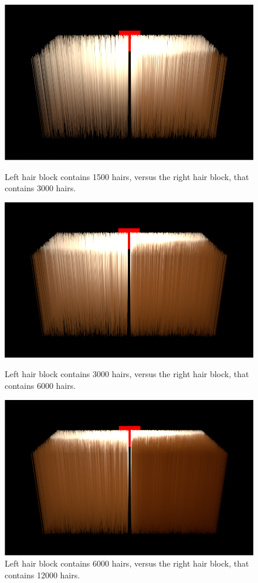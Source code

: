 \documentclass[11pt,a4paper]{report}
\begin{document}
\begin{figure}[h]
\begin{center}
\includegraphics[scale=0.35]{images/dualblock/dualblock_1500_3000_.png} 
\label{dualblock_results}
\caption{Left hair block contains 1500 hairs, versus the right hair block, that contains 3000 hairs.}

\includegraphics[scale=0.35]{images/dualblock/dualblock_3000_6000_.png}
\label{dualblock_results}
\caption{Left hair block contains 3000 hairs, versus the right hair block, that contains 6000 hairs.}

\includegraphics[scale=0.35]{images/dualblock/dualblock_6000_12000_.png}
\caption{Left hair block contains 6000 hairs, versus the right hair block, that contains 12000 hairs.}
\end{center}
\end{figure}
\end{document}
